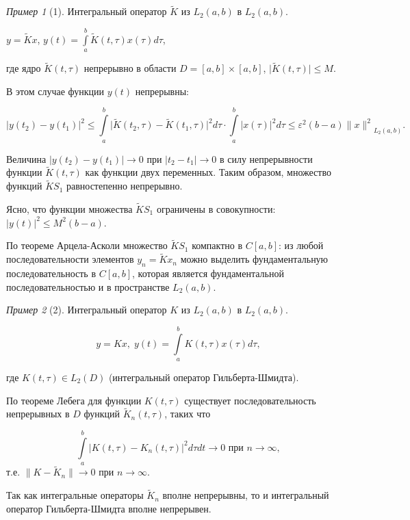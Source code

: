 \documentclass[12pt,a4paper,titlepage,oneside]{book}
\theoremstyle{definition}
\theoremstyle{plain}
\theoremstyle{break}
\theoremstyle{remark}
\theoremstyle{remark}
\newtheorem*{example}{Пример}
\theoremstyle{remark}
\theoremstyle{remark}
\theoremstyle{plain}
\theoremstyle{plain}
\begin{document}
\begin{example}[1]
Интегральный оператор $\widetilde{K}$ из $L_2(a,b)$ в $L_2(a,b)$.

\begin{center}
$y=\widetilde{K}x$, $y(t)=\displaystyle\int\limits_a^b \widetilde{K}(t, \tau)x(\tau)d\tau$,
\end{center}

где ядро $\widetilde{K}(t, \tau)$ непрерывно в области $D=[a,b]\times[a,b]$, $\vert \widetilde{K}(t, \tau) \vert \leqslant M$.

В этом случае функции $y(t)$ непрерывны:

$$\vert y(t_2)-y(t_1) \vert^2 \leqslant \displaystyle\int\limits_a^b \vert \widetilde{K}(t_2, \tau)-\widetilde{K}(t_1, \tau) \vert^2d\tau \cdot \displaystyle\int\limits_a^b \vert x(\tau) \vert^2 d\tau \leqslant \varepsilon^2 (b-a){\lVert x\rVert^2}_{L_2(a,b)}.$$

Величина $\vert y(t_2)-y(t_1) \vert \to 0$ при $\vert t_2-t_1 \vert \to 0$ в силу непрерывности функции $\widetilde{K}(t, \tau)$ как функции двух переменных. Таким образом, множество функций $\widetilde{K} S_1$ равностепенно непрерывно.

Ясно, что функции множества $\widetilde{K} S_1$ ограничены в совокупности: $\vert y(t) \vert^2 \leqslant M^2 (b-a)$.

По теореме Арцела-Асколи множество $\widetilde{K} S_1$ компактно в $C[a,b]$: из любой последовательности элементов $y_n=\widetilde{K} x_n$ можно выделить фундаментальную последовательность в $C[a,b]$, которая является фундаментальной последовательностью и в пространстве $L_2 (a,b)$.
\end{example}

\begin{example}[2]
Интегральный оператор $K$ из $L_2(a,b)$ в $L_2(a,b)$.

$$y=Kx, \; y(t) = \displaystyle\int\limits_a^b K(t, \tau)x(\tau)d\tau,$$

где $K(t, \tau)\in L_2(D)$ (интегральный оператор Гильберта-Шмидта).

По теореме Лебега для функции $K(t, \tau)$ существует последовательность непрерывных в $D$ функций $\widetilde{K}_n (t, \tau)$, таких что

$$\displaystyle\int\limits_a^b \big\vert K(t, \tau) - K_n(t, \tau)\big\vert^2d\tau dt \to 0 \mbox{ при } n\to \infty,$$
т.е. $\lVert K-\widetilde{K}_n \rVert \to 0$ при $n\to \infty$.

Так как интегральные операторы $\widetilde{K}_n$ вполне непрерывны, то и интегральный оператор Гильберта-Шмидта вполне непрерывен.
\end{example}
\end{document}
